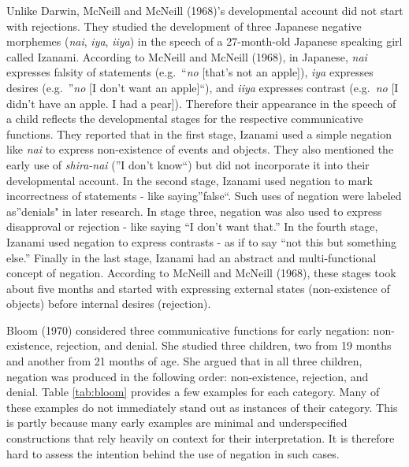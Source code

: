 \documentclass[
  english,
  man,floatsintext]{apa6}
\begin{document}
Unlike Darwin, McNeill and McNeill (1968)'s developmental account did not start with rejections. They studied the development of three Japanese negative morphemes (\emph{nai}, \emph{iya}, \emph{iiya}) in the speech of a 27-month-old Japanese speaking girl called Izanami. According to McNeill and McNeill (1968), in Japanese, \emph{nai} expresses falsity of statements (e.g.~``\emph{no} {[}that's not an apple{]}), \emph{iya} expresses desires (e.g.~''\emph{no} {[}I don't want an apple{]}``), and \emph{iiya} expresses contrast (e.g.~\emph{no} {[}I didn't have an apple. I had a pear{]}). Therefore their appearance in the speech of a child reflects the developmental stages for the respective communicative functions. They reported that in the first stage, Izanami used a simple negation like \emph{nai} to express non-existence of events and objects. They also mentioned the early use of \emph{shira-nai} (''I don't know``) but did not incorporate it into their developmental account. In the second stage, Izanami used negation to mark incorrectness of statements - like saying''false``. Such uses of negation were labeled as''denials" in later research. In stage three, negation was also used to express disapproval or rejection - like saying ``I don't want that.'' In the fourth stage, Izanami used negation to express contrasts - as if to say ``not this but something else.'' Finally in the last stage, Izanami had an abstract and multi-functional concept of negation. According to McNeill and McNeill (1968), these stages took about five months and started with expressing external states (non-existence of objects) before internal desires (rejection).

Bloom (1970) considered three communicative functions for early negation: non-existence, rejection, and denial. She studied three children, two from 19 months and another from 21 months of age. She argued that in all three children, negation was produced in the following order: non-existence, rejection, and denial. Table \ref{tab:bloom} provides a few examples for each category. Many of these examples do not immediately stand out as instances of their category. This is partly because many early examples are minimal and underspecified constructions that rely heavily on context for their interpretation. It is therefore hard to assess the intention behind the use of negation in such cases.
\end{document}
